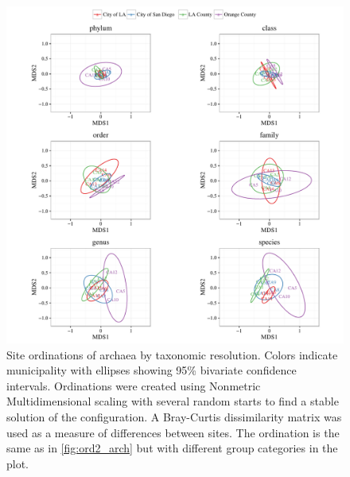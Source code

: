 \documentclass[letterpaper,12pt]{article}\usepackage[]{graphicx}\usepackage[]{color}
\newenvironment{knitrout}{}{} %
\begin{document}
\begin{knitrout}
\color{fgcolor}\begin{figure}[!ht]

{\centering \includegraphics[width=\textwidth]{figs/ord1_arch-1} 

}

\caption{Site ordinations of archaea by taxonomic resolution.  Colors indicate municipality with ellipses showing 95\% bivariate confidence intervals.  Ordinations were created using Nonmetric Multidimensional scaling with several random starts to find a stable solution of the configuration.  A Bray-Curtis dissimilarity matrix was used as a measure of differences between sites. The ordination is the same as in \cref{fig:ord2_arch} but with different group categories in the plot.}\label{fig:ord1_arch}
\end{figure}


\end{knitrout}
\end{document}

